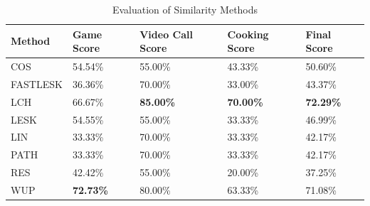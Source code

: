 \documentclass[11pt]{article}
\begin{document}
\begin{table}
\centering
\caption{Evaluation of Similarity Methods}
\label{table:method-results}
\begin{tabular}{l|l|l|l|l}
\textbf{Method} & \textbf{Game Score} & \textbf{Video Call Score} & \textbf{Cooking Score} & \textbf{Final Score} \\ \hline
COS             & 54.54\%             & 55.00\%                     & 43.33\%                & 50.60\%              \\ \hline
FASTLESK        & 36.36\%             & 70.00\%                     & 33.00\%                & 43.37\%              \\ \hline
LCH             & 66.67\%             & \textbf{85.00\%}            & \textbf{70.00\%}       & \textbf{72.29\%}     \\ \hline
LESK            & 54.55\%             & 55.00\%                     & 33.33\%                & 46.99\%              \\ \hline
LIN             & 33.33\%             & 70.00\%                     & 33.33\%                & 42.17\%              \\ \hline
PATH            & 33.33\%             & 70.00\%                     & 33.33\%                & 42.17\%              \\ \hline
RES             & 42.42\%             & 55.00\%                     & 20.00\%                & 37.25\%              \\ \hline
WUP             & \textbf{72.73\%}    & 80.00\%                     & 63.33\%                & 71.08\%               
\end{tabular}
\end{table}
\end{document}
